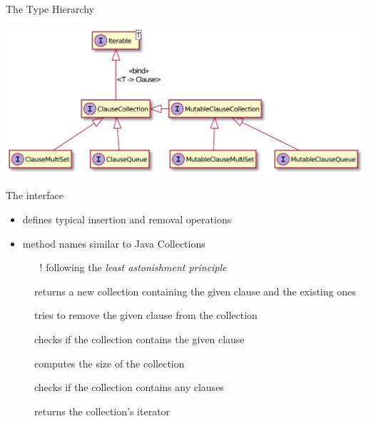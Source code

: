 \documentclass[handout]{beamer}
\begin{document}
\begin{frame}[allowframebreaks]{The  Type Hierarchy}

    \begin{center}
        \includegraphics[width=\linewidth]{img/clause-collections.pdf}
    \end{center}

    \framebreak

    \begin{block}{The  interface}
        \begin{itemize}
            \item defines typical insertion and removal operations
            \item method names similar to Java Collections
            \begin{itemize}
                \item [!] following the \textit{least astonishment principle}
            \end{itemize}
        \end{itemize}
    \end{block}
    \begin{description}
        \item[] returns a new collection containing the given clause and the existing ones
        \item[] tries to remove the given clause from the collection
        \item[] checks if the collection contains the given clause
        \item[] computes the size of the collection
        \item[] checks if the collection contains any clauses
        \item[] returns the collection's iterator
    \end{description}


\end{frame}
\end{document}
